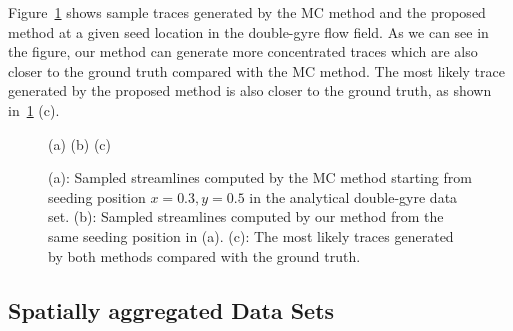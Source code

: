 Figure~\ref{case_1} shows sample traces generated by the MC method and the proposed method at a given seed location in the double-gyre flow field. As we can see in the figure, our method can generate more concentrated traces which are also closer to the ground truth compared with the MC method. The most likely trace generated by the proposed method is also closer to the ground truth, as shown in~\ref{case_1} (c).

\begin{figure}[!htb]
   \centering
  \small
  (a)  \hfill
  (b)  \hfill
  (c) 
  \caption{(a): Sampled streamlines computed by the MC method starting from seeding position $x=0.3, y=0.5$ in the analytical double-gyre data set. (b): Sampled streamlines computed by our method from the same seeding position in (a). (c): The most likely traces generated by both methods compared with the ground truth.}
  \label{case_1}
\end{figure}

\subsection{Spatially aggregated Data Sets}

